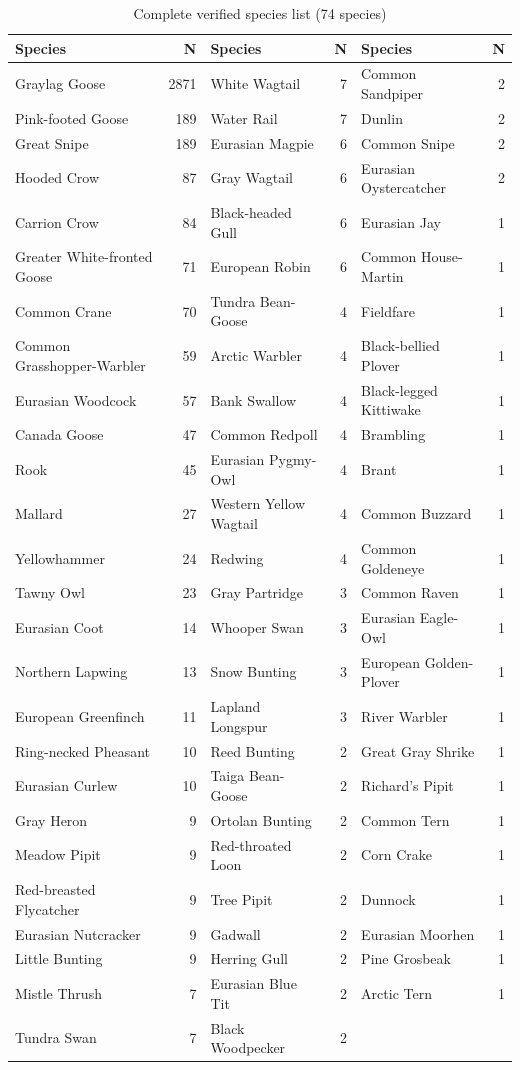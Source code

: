 \documentclass[twocolumn]{article}
\begin{document}
\begin{table}[H]
\centering
\caption{Complete verified species list (74 species)}
\label{tab:species_full}
\tiny
\begin{tabular}{lr|lr|lr}
\toprule
\textbf{Species} & \textbf{N} & \textbf{Species} & \textbf{N} & \textbf{Species} & \textbf{N} \\
\midrule
Graylag Goose & 2871 & White Wagtail & 7 & Common Sandpiper & 2 \\
Pink-footed Goose & 189 & Water Rail & 7 & Dunlin & 2 \\
Great Snipe & 189 & Eurasian Magpie & 6 & Common Snipe & 2 \\
Hooded Crow & 87 & Gray Wagtail & 6 & Eurasian Oystercatcher & 2 \\
Carrion Crow & 84 & Black-headed Gull & 6 & Eurasian Jay & 1 \\
Greater White-fronted Goose & 71 & European Robin & 6 & Common House-Martin & 1 \\
Common Crane & 70 & Tundra Bean-Goose & 4 & Fieldfare & 1 \\
Common Grasshopper-Warbler & 59 & Arctic Warbler & 4 & Black-bellied Plover & 1 \\
Eurasian Woodcock & 57 & Bank Swallow & 4 & Black-legged Kittiwake & 1 \\
Canada Goose & 47 & Common Redpoll & 4 & Brambling & 1 \\
Rook & 45 & Eurasian Pygmy-Owl & 4 & Brant & 1 \\
Mallard & 27 & Western Yellow Wagtail & 4 & Common Buzzard & 1 \\
Yellowhammer & 24 & Redwing & 4 & Common Goldeneye & 1 \\
Tawny Owl & 23 & Gray Partridge & 3 & Common Raven & 1 \\
Eurasian Coot & 14 & Whooper Swan & 3 & Eurasian Eagle-Owl & 1 \\
Northern Lapwing & 13 & Snow Bunting & 3 & European Golden-Plover & 1 \\
European Greenfinch & 11 & Lapland Longspur & 3 & River Warbler & 1 \\
Ring-necked Pheasant & 10 & Reed Bunting & 2 & Great Gray Shrike & 1 \\
Eurasian Curlew & 10 & Taiga Bean-Goose & 2 & Richard's Pipit & 1 \\
Gray Heron & 9 & Ortolan Bunting & 2 & Common Tern & 1 \\
Meadow Pipit & 9 & Red-throated Loon & 2 & Corn Crake & 1 \\
Red-breasted Flycatcher & 9 & Tree Pipit & 2 & Dunnock & 1 \\
Eurasian Nutcracker & 9 & Gadwall & 2 & Eurasian Moorhen & 1 \\
Little Bunting & 9 & Herring Gull & 2 & Pine Grosbeak & 1 \\
Mistle Thrush & 7 & Eurasian Blue Tit & 2 & Arctic Tern & 1 \\
Tundra Swan & 7 & Black Woodpecker & 2 &  &  \\
\bottomrule
\end{tabular}
\end{table}
\end{document}
